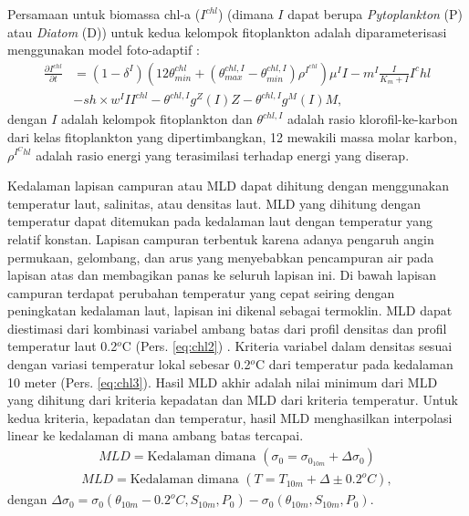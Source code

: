 \begin{spacing}{1.5}
	Persamaan untuk biomassa chl-a ($I^{chl}$) (dimana $I$ dapat berupa \textit{Pytoplankton} (P) atau \textit{Diatom} (D)) untuk kedua kelompok fitoplankton adalah diparameterisasi menggunakan model foto-adaptif :
	\begin{equation}\label{eq:chl1}
		\begin{aligned}
			\frac{\partial I^{chl}}{\partial t} &= (1-\delta ^I)(12\theta^{chl}_{min}+(\theta^{chl,I}_{max}-\theta^{chl,I}_{min})\rho^{I^{chl}})\mu^I I-m^I \frac{I}{K_m +I}I^chl \\
			&- sh \times w^I II^{chl}-\theta^{chl,I}g^Z(I)Z-\theta^{chl,I}g^M(I)M,
		\end{aligned}
	\end{equation}
	dengan $I$ adalah kelompok fitoplankton dan $\theta^{chl,I}$ adalah rasio klorofil-ke-karbon dari kelas fitoplankton yang dipertimbangkan, 12 mewakili massa molar karbon, $\rho^{I^Chl}$ adalah rasio energi yang terasimilasi terhadap energi yang diserap.
	
	Kedalaman lapisan campuran atau MLD dapat dihitung dengan menggunakan temperatur laut, salinitas, atau densitas laut. MLD yang dihitung dengan temperatur dapat ditemukan pada kedalaman laut dengan temperatur yang relatif konstan. Lapisan campuran terbentuk karena adanya pengaruh angin permukaan, gelombang, dan arus yang menyebabkan pencampuran air pada lapisan atas dan membagikan panas ke seluruh lapisan ini. Di bawah lapisan campuran terdapat perubahan temperatur yang cepat seiring dengan peningkatan kedalaman laut, lapisan ini dikenal sebagai termoklin. MLD dapat diestimasi dari kombinasi variabel ambang batas dari profil densitas dan profil temperatur laut 0.2$^o$C (Pers. \ref{eq:chl2}) \cite{Boyer2004}. 
	Kriteria variabel dalam densitas sesuai dengan variasi temperatur lokal sebesar 0.2$^o$C dari temperatur pada kedalaman 10 meter (Pers. \ref{eq:chl3}). Hasil MLD akhir adalah nilai minimum dari MLD yang dihitung dari kriteria kepadatan dan MLD dari kriteria temperatur. Untuk kedua kriteria, kepadatan dan temperatur, hasil MLD menghasilkan interpolasi linear ke kedalaman di mana ambang batas tercapai.
	\begin{equation}\label{eq:chl2}
		\begin{aligned}
			MLD= \text{Kedalaman dimana }(\sigma_0=\sigma_{0_{10m}}+\Delta \sigma_0)
		\end{aligned}
	\end{equation}
	\begin{equation}\label{eq:chl3}
		\begin{aligned}
			MLD= \text{Kedalaman dimana }(T=T_{10m}+\Delta \pm 0.2^oC),
		\end{aligned}
	\end{equation}
	dengan $\Delta \sigma_0=\sigma_0(\theta_{10m}-0.2^oC,S_{10m},P_0)-\sigma_0(\theta_{10m},S_{10m},P_0)$.

\end{spacing}
